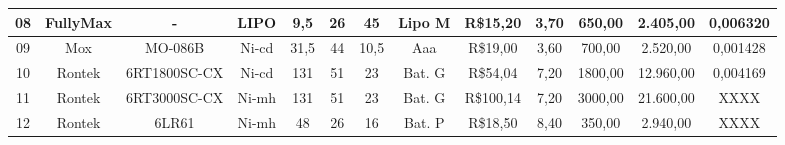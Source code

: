 \begin{table}[htp]
\begin{tabular}{|c|c|c|c|c|c|c|c|c|c|c|c|c|}
08                                               & FullyMax                                    & -                                            & LIPO                                                 & 9,5        & 26        & 45        & Lipo M                                                  & R\$15,20                                    & 3,70                                                     & 650,00                                    & 2.405,00                                 & 0,006320                                       \\[2pt] \hline
09                                               & Mox                                         & MO-086B                                      & Ni-cd                                                & 31,5       & 44        & 10,5      & Aaa                                                     & R\$19,00                                    & 3,60                                                     & 700,00                                    & 2.520,00                                 & 0,001428                                       \\[2pt] \hline
10                                               & Rontek                                      & 6RT1800SC-CX                                 & Ni-cd                                                & 131        & 51        & 23        & Bat. G                                                  & R\$54,04                                    & 7,20                                                     & 1800,00                                   & 12.960,00                                & 0,004169                                       \\[2pt] \hline
11                                               & Rontek                                      & 6RT3000SC-CX                                 & Ni-mh                                                & 131        & 51        & 23        & Bat. G                                                  & R\$100,14                                   & 7,20                                                     & 3000,00                                   & 21.600,00                                & XXXX                                           \\[2pt] \hline
12                                               & Rontek                                      & 6LR61                                        & Ni-mh                                                & 48         & 26        & 16        & Bat. P                                                  & R\$18,50                                    & 8,40                                                     & 350,00                                    & 2.940,00                                 & XXXX                                           \\[2pt] \hline

\end{tabular}
\end{table}

